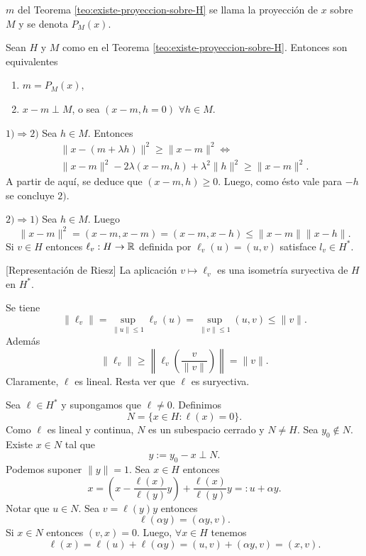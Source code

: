 \begin{definicion}{}
$m$ del Teorema \ref{teo:existe-proyeccion-sobre-H} se llama la proyecci\'on de $x$ sobre $M$ y se denota $P_M(x)$.
\end{definicion}

\begin{teorema}{}
Sean $H$ y $M$ como en el Teorema \ref{teo:existe-proyeccion-sobre-H}. 
Entonces son equivalentes
\begin{enumerate}
    \item $m=P_M(x)$,
    \item $x-m \perp M$, o sea  $(x-m,h =0)$ $\forall h \in M$.
\end{enumerate}
\end{teorema}

\begin{demo}
$1) \Rightarrow 2)$
Sea $h\in M$. Entonces
\[
\begin{split}
\|x-(m+\lambda h)  \|^2 \geq \| x-m\|^2 \Leftrightarrow
\\
\|x-m\|^2-2\lambda (x-m,h)+\lambda^2 \|h\|^2\geq \|x-m\|^2.
\end{split}
\]
A partir de aqu\'i, se deduce que $(x-m,h)\geq 0$. Luego, como \'esto vale para $-h$ se concluye $2)$.

$2) \Rightarrow 1)$ Sea $h\in M$. Luego
\[
\|x-m\|^2=(x-m,x-m)=(x-m,x-h)\leq \|x-m\| \|x-h\|.
\]
Si $v \in H$ entonces $\ell_v: H \to \mathbb{R}$ definida por $\ell_v(u)=(u,v)$
satisface $l_v \in H^*$.
\end{demo}


\begin{teorema}{}[Representaci\'on de Riesz]
La aplicaci\'on $v \longmapsto \ell_v$ es una isometr\'ia suryectiva de
$H$ en $H^*$.
\end{teorema}

\begin{demo}
Se tiene 
\[
\|\ell_v\|=\sup\limits_{\|u\|\leq 1} \ell_v(u) =
\sup\limits_{\|v\|\leq 1} (u,v)\leq \|v\|.
\]
Adem\'as
\[
\|\ell_v\|\geq \left\|\ell_v\left(\frac{v}{\|v\|}\right) \right\|
=\|v\|.
\]
Claramente, $\ell$ es lineal. Resta ver que $\ell$ es suryectiva. 

Sea $\ell \in H^*$ y supongamos que $\ell \neq 0$. Definimos
\[
N=\{ x \in H: \ell(x)=0  \}.
\]
Como $\ell $ es lineal y continua, $N$ es un subespacio cerrado y $N \neq H$. Sea $y_0 \notin N$. Existe $x \in N$ tal que \[y:=y_0-x \perp N.\]
Podemos suponer $\|y\|=1$. 
Sea $x \in H$ entonces
\[
x=\left( x- \frac{\ell(x)}{\ell(y)} y \right)+\frac{\ell(x)}{\ell(y)} y=:
u+\alpha y.
\]
Notar que $u \in N$. Sea $v=\ell(y) y$ entonces
\[
\ell(\alpha y)=(\alpha y,v).
\]
Si $x \in N$ entonces $(v,x)=0$. Luego, $\forall x \in H$ tenemos
\[
\ell(x)=\ell(u)+\ell(\alpha y)=(u,v)+(\alpha y,v)=(x,v).
\]
\end{demo}

